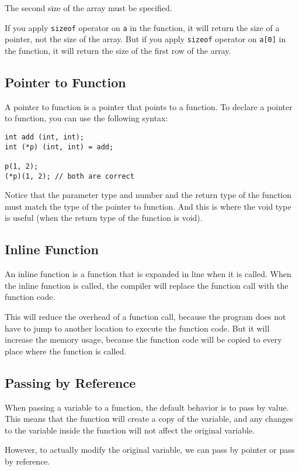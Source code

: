 \documentclass[a4paper,12pt]{article}
\begin{document}
The second size of the array must be specified.

If you apply \texttt{sizeof} operator on \texttt{a} in the function, it will return the size of a pointer, not the size of the array.
But if you apply \texttt{sizeof} operator on \texttt{a[0]} in the function, it will return the size of the first row of the array.

\subsection{Pointer to Function}

A pointer to function is a pointer that points to a function.
To declare a pointer to function, you can use the following syntax:
\begin{verbatim}
int add (int, int);
int (*p) (int, int) = add;

p(1, 2);
(*p)(1, 2); // both are correct
\end{verbatim}

Notice that the parameter type and number and the return type of the function must match the type of the pointer to function.
And this is where the void type is useful (when the return type of the function is void).

\subsection{Inline Function}

An inline function is a function that is expanded in line when it is called.
When the inline function is called, the compiler will replace the function call with the function code.

This will reduce the overhead of a function call, because the program does not have to jump to another location to execute the function code.
But it will increase the memory usage, because the function code will be copied to every place where the function is called.

\subsection{Passing by Reference}

When passing a variable to a function, the default behavior is to pass by value.
This means that the function will create a copy of the variable, and any changes to the variable inside the function will not affect the original variable.

However, to actually modify the original variable, we can pass by pointer or pass by reference.
\end{document}
